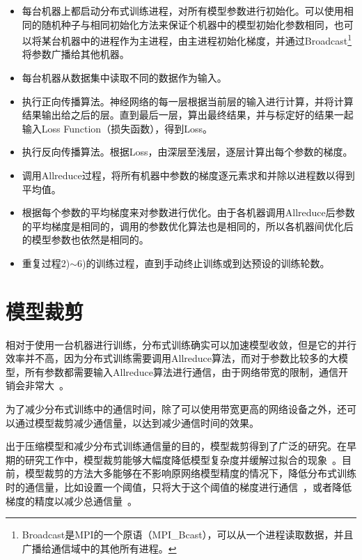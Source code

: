 \begin{itemize}
    \item [1)]
    每台机器上都启动分布式训练进程，对所有模型参数进行初始化。可以使用相同的随机种子与相同初始化方法来保证个机器中的模型初始化参数相同，也可以将某台机器中的进程作为主进程，由主进程初始化梯度，并通过Broadcast\footnote{Broadcast是MPI的一个原语（MPI\_Bcast），可以从一个进程读取数据，并且广播给通信域中的其他所有进程。}将参数广播给其他机器。
    \item [2)]
    每台机器从数据集中读取不同的数据作为输入。
    \item [3)]
    执行正向传播算法。神经网络的每一层根据当前层的输入进行计算，并将计算结果输出给之后的层。直到最后一层，算出最终结果，并与标定好的结果一起输入Loss Function（损失函数），得到Loss。
    \item [4)]
    执行反向传播算法。根据Loss，由深层至浅层，逐层计算出每个参数的梯度。
    \item [5)]
    调用Allreduce过程，将所有机器中参数的梯度逐元素求和并除以进程数以得到平均值。
    \item [6)]
    根据每个参数的平均梯度来对参数进行优化。由于各机器调用Allreduce后参数的平均梯度是相同的，调用的参数优化算法也是相同的，所以各机器间优化后的模型参数也依然是相同的。
    \item [7)]
    重复过程2)$\sim$6)的训练过程，直到手动终止训练或到达预设的训练轮数。
\end{itemize}

\section{模型裁剪}

相对于使用一台机器进行训练，分布式训练确实可以加速模型收敛，但是它的并行效率并不高，因为分布式训练需要调用Allreduce算法，而对于参数比较多的大模型，所有参数都需要输入Allreduce算法进行通信，由于网络带宽的限制，通信开销会非常大~\cite{li2014communication, wen2017terngrad}。

为了减少分布式训练中的通信时间，除了可以使用带宽更高的网络设备之外，还可以通过模型裁剪减少通信量，以达到减少通信时间的效果。

出于压缩模型和减少分布式训练通信量的目的，模型裁剪得到了广泛的研究。在早期的研究工作中，模型裁剪能够大幅度降低模型复杂度并缓解过拟合的现象~\cite{lecun1990optimal, hanson1989comparing, hassibi1993second}。目前，模型裁剪的方法大多能够在不影响原网络模型精度的情况下，降低分布式训练时的通信量，比如设置一个阈值，只将大于这个阈值的梯度进行通信~\cite{strom2015scalable}，或者降低梯度的精度以减少总通信量~\cite{seide20141}。


